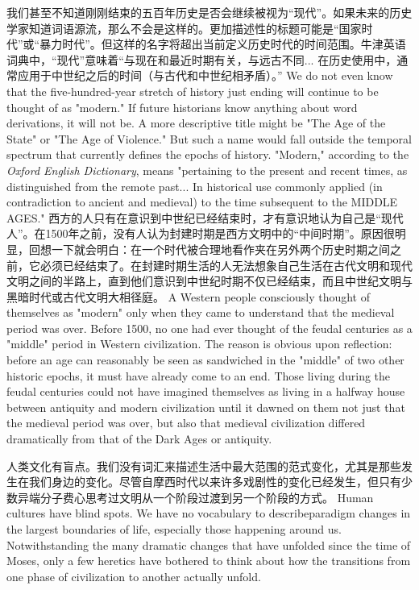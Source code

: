 \begin{paracol}{2}
\switchcolumn*
我们甚至不知道刚刚结束的五百年历史是否会继续被视为“现代”。如果未来的历史学家知道词语源流，那么不会是这样的。更加描述性的标题可能是“国家时代”或“暴力时代”。但这样的名字将超出当前定义历史时代的时间范围。牛津英语词典中，“现代”意味着“与现在和最近时期有关，与远古不同... 在历史使用中，通常应用于中世纪之后的时间（与古代和中世纪相矛盾）。”
\switchcolumn
We do not even know that the five-hundred-year stretch of history just ending will continue to be thought of as "modern." If future historians know anything about word derivations, it will not be. A more descriptive title might be "The Age of the State" or "The Age of Violence." But such a name would fall outside the temporal spectrum that currently defines the epochs of history. "Modern," according to the \emph{Oxford English Dictionary}, means "pertaining to the present and recent times, as distinguished from the remote past... In historical use commonly applied (in contradiction to ancient and medieval) to the time subsequent to the MIDDLE AGES."
\switchcolumn*
西方的人只有在意识到中世纪已经结束时，才有意识地认为自己是“现代人”。在1500年之前，没有人认为封建时期是西方文明中的“中间时期”。原因很明显，回想一下就会明白：在一个时代被合理地看作夹在另外两个历史时期之间之前，它必须已经结束了。在封建时期生活的人无法想象自己生活在古代文明和现代文明之间的半路上，直到他们意识到中世纪时期不仅已经结束，而且中世纪文明与黑暗时代或古代文明大相径庭。
\switchcolumn
A Western people consciously thought of themselves as "modern" only when they came to understand that the medieval period was over. Before 1500, no one had ever thought of the feudal centuries as a "middle" period in Western civilization. The reason is obvious upon reflection: before an age can reasonably be seen as sandwiched in the "middle" of two other historic epochs, it must have already come to an end. Those living during the feudal centuries could not have imagined themselves as living in a halfway house between antiquity and modern civilization until it dawned on them not just that the medieval period was over, but also that medieval civilization differed dramatically from that of the Dark Ages or antiquity.

\switchcolumn*
人类文化有盲点。我们没有词汇来描述生活中最大范围的范式变化，尤其是那些发生在我们身边的变化。尽管自摩西时代以来许多戏剧性的变化已经发生，但只有少数异端分子费心思考过文明从一个阶段过渡到另一个阶段的方式。
\switchcolumn
Human cultures have blind spots. We have no vocabulary to describeparadigm changes in the largest boundaries of life, especially those happening around us. Notwithstanding the many dramatic changes that have unfolded since the time of Moses, only a few heretics have bothered to think about how the transitions from one phase of civilization to another actually unfold.


\end{paracol}
